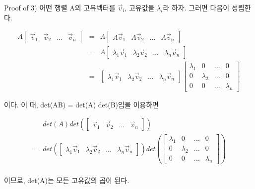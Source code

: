 \documentclass{beamer}
\begin{document}
\begin{frame}[allowframebreaks]{Proof of 3)} 
어떤 행렬 A의 고유벡터를 $\vec{v}_i$, 고유값을 $\lambda_i$라 하자. 그러면 다음이 성립한다. 

\begin{eqnarray}
A \left[ \begin{matrix} 
\vec{v}_1 & \vec{v}_2 & ... & \vec{v}_n
\end{matrix} \right] 
 &=& A \left[ \begin{matrix} 
A\vec{v}_1 & A\vec{v}_2 & ... & A\vec{v}_n
\end{matrix} \right]  \\
&=& A \left[ \begin{matrix} 
\lambda_1 \vec{v}_1 & \lambda_2 \vec{v}_2 & ... & \lambda_n \vec{v}_n
\end{matrix} \right] \\
&=& \left[ \begin{matrix} 
\lambda_1 \vec{v}_1 & \lambda_2 \vec{v}_2 & ... & \lambda_n \vec{v}_n
\end{matrix} \right] 
\left[ \begin{matrix} 
\lambda_1 & 0 & ... & 0 \\
0 & \lambda_2 & ... & 0 \\
0 & 0 & ... & \lambda_n 
\end{matrix} \right] 
\end{eqnarray}

이다. 이 때, det(AB) = det(A) det(B)임을 이용하면 

\begin{eqnarray} 
& det(A) det \left( \left[ \begin{matrix} 
\vec{v}_1 & \vec{v}_2 & ... & \vec{v}_n
\end{matrix} \right]  \right) \\
= & det\left(\left[ \begin{matrix} 
\lambda_1 \vec{v}_1 & \lambda_2 \vec{v}_2 & ... & \lambda_n \vec{v}_n
\end{matrix} \right] \right)
det \left(\left[ \begin{matrix} 
\lambda_1 & 0 & ... & 0 \\
0 & \lambda_2 & ... & 0 \\
0 & 0 & ... & \lambda_n 
\end{matrix} \right] \right)\\
\end{eqnarray}

이므로, det(A)는 모든 고유값의 곱이 된다. 
\end{frame}
\end{document}
